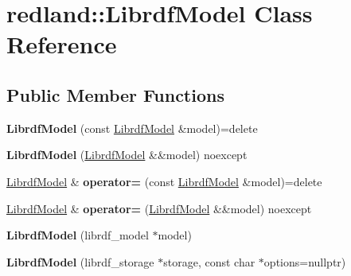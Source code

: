 \hypertarget{classredland_1_1LibrdfModel}{}\section{redland\+:\+:Librdf\+Model Class Reference}
\label{classredland_1_1LibrdfModel}
\subsection*{Public Member Functions}
\begin{DoxyCompactItemize}
\item 
\mbox{\label{classredland_1_1LibrdfModel_a5a35c032585e38b1d41bc18f057128c1}} 
{\bfseries Librdf\+Model} (const \hyperlink{classredland_1_1LibrdfModel}{Librdf\+Model} \&model)=delete
\item 
\mbox{\label{classredland_1_1LibrdfModel_a583e0eaecfe167ccbbeac5d768bcd644}} 
{\bfseries Librdf\+Model} (\hyperlink{classredland_1_1LibrdfModel}{Librdf\+Model} \&\&model) noexcept
\item 
\mbox{\label{classredland_1_1LibrdfModel_a7bd07324b31fa8eb8f5f2e51b15044fc}} 
\hyperlink{classredland_1_1LibrdfModel}{Librdf\+Model} \& {\bfseries operator=} (const \hyperlink{classredland_1_1LibrdfModel}{Librdf\+Model} \&model)=delete
\item 
\mbox{\label{classredland_1_1LibrdfModel_a9007acfb92943e018d20d6985c811033}} 
\hyperlink{classredland_1_1LibrdfModel}{Librdf\+Model} \& {\bfseries operator=} (\hyperlink{classredland_1_1LibrdfModel}{Librdf\+Model} \&\&model) noexcept
\item 
\mbox{\label{classredland_1_1LibrdfModel_a8b7d3063e030ce8613dcd6def7463a5a}} 
{\bfseries Librdf\+Model} (librdf\+\_\+model $\ast$model)
\item 
\mbox{\label{classredland_1_1LibrdfModel_a355e16664fa50a8a3085f4070347106f}} 
{\bfseries Librdf\+Model} (librdf\+\_\+storage $\ast$storage, const char $\ast$options=nullptr)
\item 
\mbox{\label{classredland_1_1LibrdfModel_ae1b996f1785adfe9b4a1824a73643248}} 

\end{DoxyCompactItemize}
